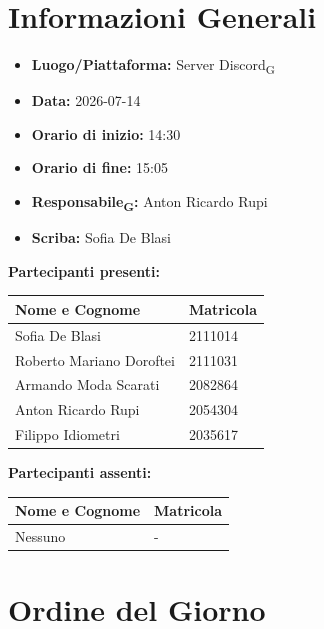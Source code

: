 \section{Informazioni Generali}
\begin{itemize}
    \item \textbf{Luogo/Piattaforma:} Server Discord\textsubscript{G}
    \item \textbf{Data:} 2026-07-14
    \item \textbf{Orario di inizio:} 14:30
    \item \textbf{Orario di fine:} 15:05
    \item \textbf{Responsabile\textsubscript{G}:} Anton Ricardo Rupi
    \item \textbf{Scriba:} Sofia De Blasi
\end{itemize}

\vspace{0.5cm}
\textbf{Partecipanti presenti:}
\begin{table}[ht]
    \centering
    \renewcommand{\arraystretch}{1.2}
    \begin{tabularx}{\textwidth}{X l}
        \toprule
        \textbf{Nome e Cognome} & \textbf{Matricola} \\
        \midrule
        Sofia De Blasi & 2111014 \\
        Roberto Mariano Doroftei & 2111031 \\
        Armando Moda Scarati & 2082864 \\
        Anton Ricardo Rupi & 2054304 \\
        Filippo Idiometri & 2035617 \\
        \bottomrule
    \end{tabularx}
\end{table}

\vspace{0.5cm}
\textbf{Partecipanti assenti:}
\begin{table}[ht]
	\centering
	\renewcommand{\arraystretch}{1.2}
	\begin{tabularx}{\textwidth}{X l}
		\toprule
		\textbf{Nome e Cognome} & \textbf{Matricola} \\
		\midrule
		Nessuno & - \\
		\bottomrule
	\end{tabularx}
\end{table}


\section{Ordine del Giorno}

